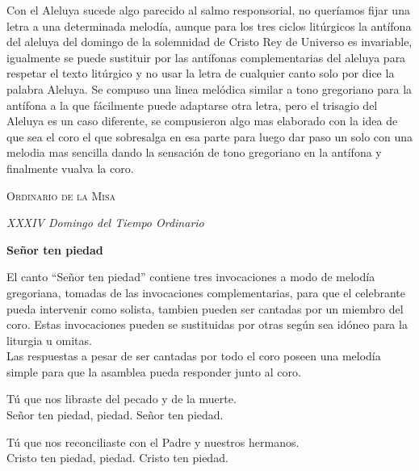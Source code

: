 \documentclass[12pt, letterpaper]{report}
\begin{document}
    Con el Aleluya sucede algo parecido al salmo responsorial, no quer\'iamos fijar una letra a una determinada melod\'ia, aunque para los tres ciclos lit\'urgicos la ant\'ifona del aleluya del domingo de la solemnidad de Cristo Rey de Universo es invariable, igualmente se puede sustituir por las ant\'ifonas complementarias del aleluya para respetar el texto lit\'urgico y no usar la letra de cualquier canto solo por dice la palabra Aleluya. Se compuso una linea mel\'odica similar a tono gregoriano para la ant\'ifona a la que f\'acilmente puede adaptarse otra letra,
    pero el trisagio del Aleluya es un caso diferente, se compusieron algo mas elaborado con la idea de que sea el coro el que sobresalga en esa parte para luego dar paso un solo con una melodia mas sencilla dando la sensaci\'on de tono gregoriano en la ant\'ifona y finalmente vualva la coro.
    \clearpage
    
    \begin{center}
        \vspace*{8cm}
        { \scshape \Huge Ordinario de la Misa \par}
        \vspace{1cm}
        { \itshape \Large XXXIV Domingo del Tiempo Ordinario \par}
    \end{center}
    \clearpage

    \begin{center}
        \Huge {\bfseries Se\~nor ten piedad}
    \end{center}

    \Large El canto ``Se\~nor ten piedad'' contiene tres invocaciones a modo de melod\'ia gregoriana, tomadas de las invocaciones complementarias, para que el celebrante pueda intervenir como solista, tambien pueden ser cantadas por un miembro del coro. Estas invocaciones pueden se sustituidas por otras seg\'un sea id\'oneo para la liturgia u omitas.\\ Las respuestas a pesar de ser cantadas por todo el coro poseen una melod\'ia simple para que la asamblea pueda responder junto al coro.
    
    \noindent
    \LARGE T\'u que nos libraste del pecado y de la muerte.\\ Se\~nor ten piedad, piedad. Se\~nor ten piedad.

    \noindent
    \LARGE T\'u que nos reconciliaste con el Padre y nuestros hermanos.\\ Cristo ten piedad, piedad. Cristo ten piedad.
\end{document}
